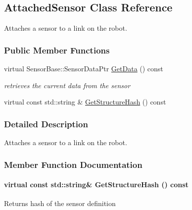 \hypertarget{classOpenRAVE_1_1RobotBase_1_1AttachedSensor}{
\subsection{AttachedSensor Class Reference}
\label{classOpenRAVE_1_1RobotBase_1_1AttachedSensor}
}


Attaches a sensor to a link on the robot.  


\subsubsection*{Public Member Functions}
\begin{DoxyCompactItemize}
\item 
\hypertarget{classOpenRAVE_1_1RobotBase_1_1AttachedSensor_a418e6eeff093f69fbdd7a025d588ee5c}{
virtual SensorBase::SensorDataPtr \hyperlink{classOpenRAVE_1_1RobotBase_1_1AttachedSensor_a418e6eeff093f69fbdd7a025d588ee5c}{GetData} () const }
\label{classOpenRAVE_1_1RobotBase_1_1AttachedSensor_a418e6eeff093f69fbdd7a025d588ee5c}

\begin{DoxyCompactList}\small\item\em retrieves the current data from the sensor \item\end{DoxyCompactList}\item 
virtual const std::string \& \hyperlink{classOpenRAVE_1_1RobotBase_1_1AttachedSensor_ae230a8d361998e79a15128bfe18ec86a}{GetStructureHash} () const 
\end{DoxyCompactItemize}


\subsubsection{Detailed Description}
Attaches a sensor to a link on the robot. 

\subsubsection{Member Function Documentation}
\hypertarget{classOpenRAVE_1_1RobotBase_1_1AttachedSensor_ae230a8d361998e79a15128bfe18ec86a}{
\paragraph[{GetStructureHash}]{\setlength{\rightskip}{0pt plus 5cm}virtual const std::string\& GetStructureHash () const}\hfill}
\label{classOpenRAVE_1_1RobotBase_1_1AttachedSensor_ae230a8d361998e79a15128bfe18ec86a}
\begin{DoxyReturn}{Returns}
hash of the sensor definition 
\end{DoxyReturn}
